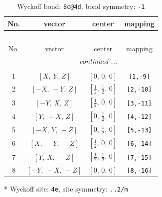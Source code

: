 \documentclass[fleqn,8pt]{jsarticle}
\begin{document}
\renewcommand{\arraystretch}{1.2}
\begin{longtable}{cccc}
\caption{Wyckoff bond: {\tt 8c@4d}, bond symmetry: {\tt -1}}
 \\
 \hline \hline
No. & vector & center & mapping \\ \hline \endfirsthead

\multicolumn{3}{l}{\tablename\ \thetable{}} \\
 \hline \hline
No. & vector & center & mapping \\ \hline \endhead

 \hline \hline
\multicolumn{3}{r}{\footnotesize\it continued ...} \\ \endfoot

 \hline \hline
\multicolumn{3}{r}{} \\ \endlastfoot

1 & $\left[ X,\, Y,\, Z \right]$ & $\left[ 0,\, 0,\, 0 \right]$ & {\tt [1,-9]} \\ \hline
2 & $\left[ - X,\, - Y,\, Z \right]$ & $\left[ \frac{1}{2},\, \frac{1}{2},\, 0 \right]$ & {\tt [2,-10]} \\ \hline
3 & $\left[ - Y,\, X,\, Z \right]$ & $\left[ \frac{1}{2},\, 0,\, 0 \right]$ & {\tt [3,-11]} \\ \hline
4 & $\left[ Y,\, - X,\, Z \right]$ & $\left[ 0,\, \frac{1}{2},\, 0 \right]$ & {\tt [4,-12]} \\ \hline
5 & $\left[ - X,\, Y,\, - Z \right]$ & $\left[ 0,\, \frac{1}{2},\, 0 \right]$ & {\tt [5,-13]} \\ \hline
6 & $\left[ X,\, - Y,\, - Z \right]$ & $\left[ \frac{1}{2},\, 0,\, 0 \right]$ & {\tt [6,-14]} \\ \hline
7 & $\left[ Y,\, X,\, - Z \right]$ & $\left[ \frac{1}{2},\, \frac{1}{2},\, 0 \right]$ & {\tt [7,-15]} \\ \hline
8 & $\left[ - Y,\, - X,\, - Z \right]$ & $\left[ 0,\, 0,\, 0 \right]$ & {\tt [8,-16]} \\
\end{longtable}
* Wyckoff site: {\tt 4e}, site symmetry: {\tt ..2/m}
\renewcommand{\arraystretch}{1.2}
\end{document}
